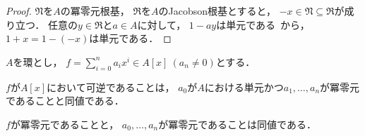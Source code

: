 \documentclass{jlreq}
\newcommand{\Nilrad}{\mathfrak{N}}
\newcommand{\JacobsonRad}{\mathfrak{R}}
\begin{document}
	\begin{proof}
		$\Nilrad$を$A$の冪零元根基，
		$\JacobsonRad$を$A$のJacobson根基とすると，
		$-x \in \Nilrad \subseteq \JacobsonRad$が成り立つ．
		任意の$y \in \JacobsonRad$と$a \in A$に対して，
		$1-ay$は単元である~\cite[命題1.9]{atiyah2006}から，
		$1+x = 1-(-x)$は単元である．
	\end{proof}
	
	\begin{proposition}[p.\,16; 演習問題2]
		$A$を環とし，
		$f = \sum_{i=0}^{n} a_i x^i \in A[x]\ (a_n \ne 0)$とする．
		\begin{propenum}
			\item\label{AM:ex.1.2.1} $f$が$A[x]$において可逆であることは，
			$a_0$が$A$における単元かつ$a_1, \dotsc, a_n$が冪零元であることと同値である．
			\item\label{AM:ex.1.2.2} $f$が冪零元であることと，
			$a_0, \dotsc, a_n$が冪零元であることは同値である．
		\end{propenum}
	\end{proposition}
	
\end{document}
